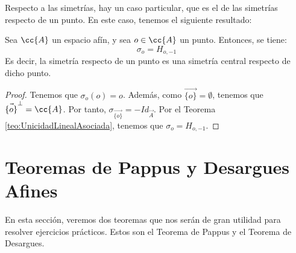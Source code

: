 Respecto a las simetrías, hay un caso particular, que es el de las simetrías respecto de un punto. En este caso, tenemos el siguiente resultado:
\begin{lema}\label{lema:SimetriaCentral}
    Sea $\cc{A}$ un espacio afín, y sea $o\in \cc{A}$ un punto. Entonces, se tiene:
    \begin{equation*}
        \sigma_{o} = H_{o,-1}
    \end{equation*}
    Es decir, la simetría respecto de un punto es una simetría central respecto de dicho punto.
\end{lema}
\begin{proof}
    Tenemos que $\sigma_{o}(o) = o$. Además, como $\vec{\{o\}} = \emptyset$, tenemos que $\vec{\{o\}}^\perp=\cc{A}$. Por tanto,
    $\sigma_{\vec{\{o\}}}=-Id_{\vec{A}}$. Por el Teorema \ref{teo:UnicidadLinealAsociada}, tenemos que $\sigma_{o} = H_{o,-1}$.
\end{proof}




\section{Teoremas de Pappus y Desargues Afines}\label{sec:TeoremasPappusDesarguesAfines}
En esta sección, veremos dos teoremas que nos serán de gran utilidad para resolver ejercicios prácticos. Estos son el Teorema de Pappus y el Teorema de Desargues.

